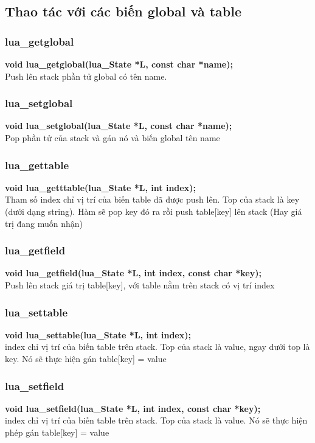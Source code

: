 \documentclass[12pt]{article}
\begin{document}
\subsection{Thao tác với các biến global và table}
\subsubsection{lua\_getglobal}
\textbf{void lua\_getglobal(lua\_State *L, const char *name);} \\
Push lên stack phần tử global có tên name.
\subsubsection{lua\_setglobal} 
\textbf{void lua\_setglobal(lua\_State *L, const char *name);} \\
Pop phần tử của stack và gán nó và biến global tên name
\subsubsection{lua\_gettable} 
\textbf{void lua\_getttable(lua\_State *L, int index);} \\
Tham số index chỉ vị trí của biến table đã được push lên. Top của stack là key (dưới dạng string). Hàm sẽ pop key đó ra rồi push table[key] lên stack (Hay giá trị đang muốn nhận)
\subsubsection{lua\_getfield}
\textbf{void lua\_getfield(lua\_State *L, int index, const char *key);} \\
Push lên stack giá trị table[key], với table nằm trên stack có vị trí index 
\subsubsection{lua\_settable} 
\textbf{void lua\_settable(lua\_State *L, int index);} \\
index chỉ vị trí của biến table trên stack. Top của stack là value, ngay dưới top là key. Nó sẽ thực hiện gán table[key] = value

\subsubsection{lua\_setfield}
\textbf{void lua\_setfield(lua\_State *L, int index, const char *key);} \\
index chỉ vị trí của biến table trên stack. Top của stack là value. Nó sẽ thực hiện phép gán table[key] = value
\end{document}
